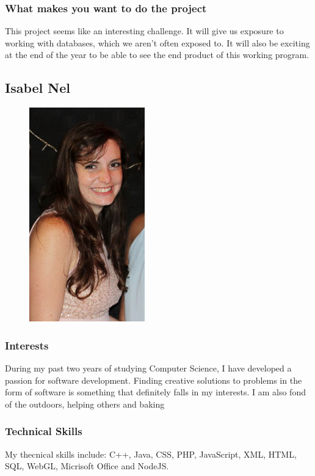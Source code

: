 \documentclass[hidelinks, 12pt, oneside]{article}
\begin{document}
\subsubsection{What makes you want to do the project}

This project seems like an interesting challenge. It will give us exposure to working with databases, which we aren't often exposed to. It will also be exciting at the end of the year to be able to see the end product of this working program.

\subsection{Isabel Nel}

\begin{figure}[ht!]
\centering
\includegraphics[width=50mm]{IsabelNel.jpg}
\end{figure}

\subsubsection{Interests}
During my past two years of studying Computer Science, I have developed a
passion for software development. Finding creative solutions to problems in
the form of software is something that definitely falls in my interests. I am
also fond of the outdoors, helping others and baking

\subsubsection{Technical Skills}
My thecnical skills include: C++, Java, CSS, PHP, JavaScript, XML, HTML,
SQL, WebGL, Micrisoft Office and NodeJS.
\end{document}
